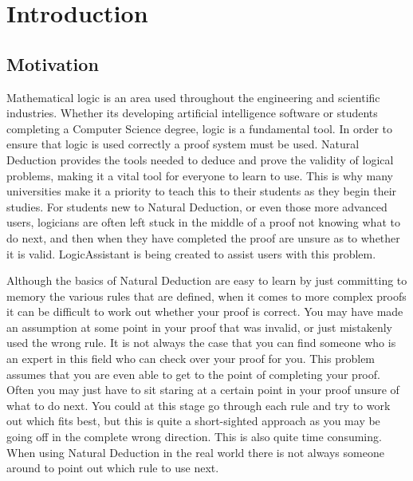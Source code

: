 

\newcommand{\reporttitle}{LogicAssistant}
\newcommand{\reportauthor}{Joshua Zeltser}
\newcommand{\supervisor}{Romain Barnoud}
\newcommand{\degreetype}{Computing}






\date{June 2017}






\pagebreak
\tableofcontents
\pagebreak

\section{Introduction}

\subsection{Motivation}

Mathematical logic is an area used throughout the engineering and scientific industries. Whether its developing artificial intelligence software or students completing a Computer Science degree, logic is a fundamental tool. In order to ensure that logic is used correctly a proof system must be used. Natural Deduction provides the tools needed to deduce and prove the validity of logical problems, making it a vital tool for everyone to learn to use. This is why many universities make it a priority to teach this to their students as they begin their studies. For students new to Natural Deduction, or even those more advanced users, logicians are often left stuck in the middle of a proof not knowing what to do next, and then when they have completed the proof are unsure as to whether it is valid. LogicAssistant is being created to assist users with this problem.

Although the basics of Natural Deduction are easy to learn by just committing to memory the various rules that are defined, when it comes to more complex proofs it can be difficult to work out whether your proof is correct. You may have made an assumption at some point in your proof that was invalid, or just mistakenly used the wrong rule. It is not always the case that you can find someone who is an expert in this field who can check over your proof for you. This problem assumes that you are even able to get to the point of completing your proof. Often you may just have to sit staring at a certain point in your proof unsure of what to do next. You could at this stage go through each rule and try to work out which fits best, but this is quite a short-sighted approach as you may be going off in the complete wrong direction. This is also quite time consuming. When using Natural Deduction in the real world there is not always someone around to point out which rule to use next. 

